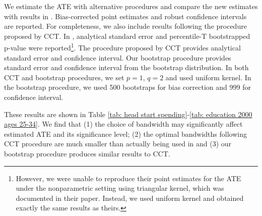 \documentclass[12pt,fleqn]{article}
\begin{document}
We estimate the ATE with alternative procedures and compare the new estimates with results in \cite{ludwig2007}. Bias-corrected point estimates and robust confidence intervals are reported. For completeness, we also include results following the procedure proposed by CCT. In \cite{ludwig2007}, analytical standard error and percentile-T bootstrapped p-value were reported\footnote{However, we were unable to reproduce their point estimates for the ATE under the nonparametric setting using triangular kernel, which was documented in their paper. Instead, we used uniform kernel and obtained exactly the same results as theirs.}. The procedure proposed by CCT provides analytical standard error and confidence interval. Our bootstrap procedure provides standard error and confidence interval from the bootstrap distribution. In both CCT and bootstrap procedures, we set $p = 1$, $q = 2$ and used uniform kernel. In the bootstrap procedure, we used 500 bootstraps for bias correction and 999 for confidence interval.

These results are shown in Table \ref{tab: head start spending}-\ref{tab: education 2000 ages 25-34}. We find that (1) the choice of bandwidth may significantly affect estimated ATE and its significance level; (2) the optimal bandwidths following CCT procedure are much smaller than actually being used in \cite{ludwig2007} and (3) our bootstrap procedure produces similar results to CCT.
\end{document}
